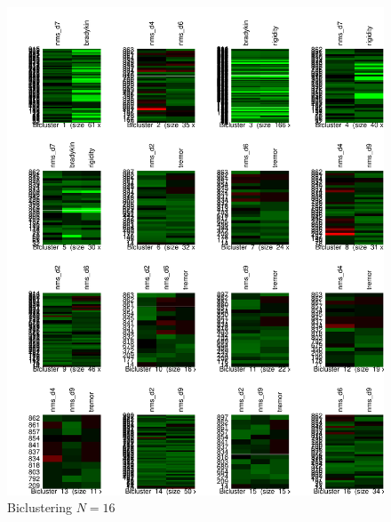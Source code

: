\documentclass[letterpaper,12pt]{article}
\begin{document}
\begin{figure}[h]
  \centering
  \includegraphics[width=\linewidth]{biclust-16.pdf}
  \caption{Biclustering $N = 16$}
  \label{fig:biclust-16}
\end{figure}
\end{document}
